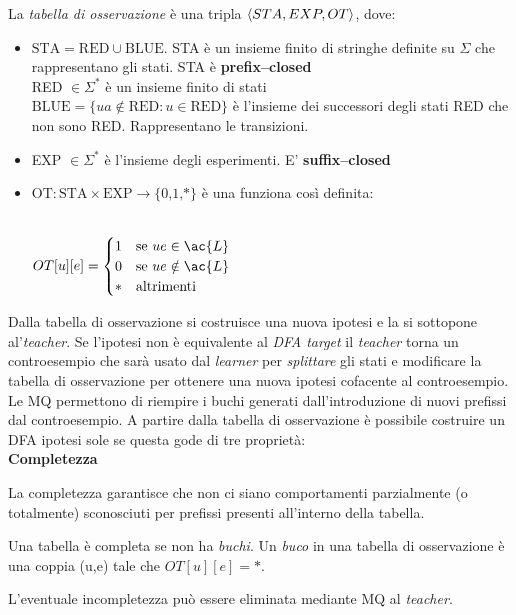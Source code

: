 \begin{definizione*} La \textit{tabella di osservazione} è una tripla $\Braket{STA, EXP, OT}$, dove:
\begin{itemize}
\item $\text{STA}=\text{RED} \cup \text{BLUE}$.  STA è un insieme finito di stringhe definite su $\Sigma$ che rappresentano gli stati. STA è \textbf{prefix--closed}\\
RED $\in \Sigma^{*}$ è un insieme finito di stati\\
$\text{BLUE} = \{ua \notin \text{RED} : u \in \text{RED}\}$ è l'insieme dei successori degli stati RED che non sono RED. Rappresentano le transizioni.
\item EXP $\in \Sigma^{*}$  è l'insieme degli esperimenti. E' \textbf{suffix--closed}
\item $\text{OT} : \text{STA} \times \text{EXP} \to \text{\{0,1,*\}}$ è una funziona così definita:\\\\
\centerline{$
OT[u][e] = 
\begin{cases}
1
& \text{se $ue \in \ac{L}$} \\
0 & \text{se $ue \notin \ac{L}$}\\
* & \text{altrimenti}
\end{cases}
$}   
\end{itemize}
\end{definizione*} 
Dalla tabella di osservazione si costruisce una nuova ipotesi e la si sottopone al'\textit{teacher}. Se l'ipotesi non è equivalente al \textit{DFA target} il \textit{teacher} torna un controesempio che sarà usato dal \textit{learner} per \textit{splittare} gli stati e modificare la tabella di osservazione per ottenere una nuova ipotesi cofacente al controesempio. Le \ac{MQ} permettono di riempire i buchi generati dall'introduzione di nuovi prefissi dal controesempio.  A partire dalla tabella di osservazione è possibile costruire un DFA ipotesi sole se questa gode di tre proprietà:\\

{\large\textbf{Completezza}}

La completezza garantisce che non ci siano comportamenti parzialmente (o totalmente) sconosciuti per prefissi presenti all'interno della tabella.
\begin{definizione*} Una tabella è completa se non ha \textit{buchi}. Un \textit{buco} in una tabella di osservazione è una coppia (u,e) tale che $OT[u][e] = *$.
\end{definizione*}
L'eventuale incompletezza può essere eliminata mediante \ac{MQ} al \textit{teacher}.\\

